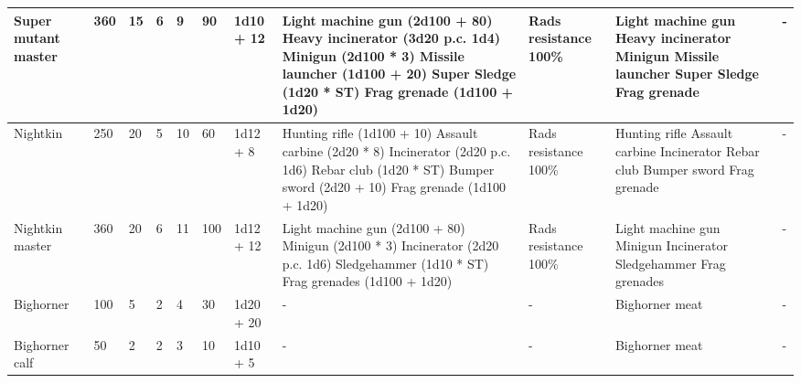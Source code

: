 \begin{longtable}{|p{2.5cm}|p{0.6cm}|p{0.6cm}|p{0.6cm}|p{0.6cm}|p{0.6cm}|p{1.5cm}|p{4cm}|p{4cm}|p{4cm}|p{2.3cm}|}
Super mutant master & 360 & 15 & 6 & 9 & 90 & 1d10 + 12 & Light machine gun (2d100 + 80) \newline Heavy incinerator (3d20 p.c. 1d4) \newline Minigun (2d100 * 3) \newline Missile launcher (1d100 + 20) \newline Super Sledge (1d20 * ST) \newline Frag grenade (1d100 + 1d20) & Rads resistance 100\% & Light machine gun \newline Heavy incinerator \newline Minigun \newline Missile launcher \newline Super Sledge \newline Frag grenade & - \\
\hline
Nightkin & 250 & 20 & 5 & 10 & 60 & 1d12 + 8 & Hunting rifle (1d100 + 10) \newline Assault carbine (2d20 * 8) \newline Incinerator (2d20 p.c. 1d6) \newline Rebar club (1d20 * ST) \newline Bumper sword (2d20 + 10) \newline Frag grenade (1d100 + 1d20) & Rads resistance 100\% & Hunting rifle \newline Assault carbine \newline Incinerator \newline Rebar club \newline Bumper sword \newline Frag grenade & - \\
\hline
Nightkin master & 360 & 20 & 6 & 11 & 100 & 1d12 + 12 & Light machine gun (2d100 + 80) \newline Minigun (2d100 * 3) \newline Incinerator (2d20 p.c. 1d6) \newline Sledgehammer (1d10 * ST) \newline Frag grenades (1d100 + 1d20) & Rads resistance 100\% & Light machine gun \newline Minigun \newline Incinerator \newline Sledgehammer \newline Frag grenades & - \\
\hline
Bighorner & 100 & 5 & 2 & 4 & 30 & 1d20 + 20 & - & - & Bighorner meat & - \\
\hline
Bighorner calf & 50 & 2 & 2 & 3 & 10 & 1d10 + 5 & - & - & Bighorner meat & - \\

\end{longtable}

